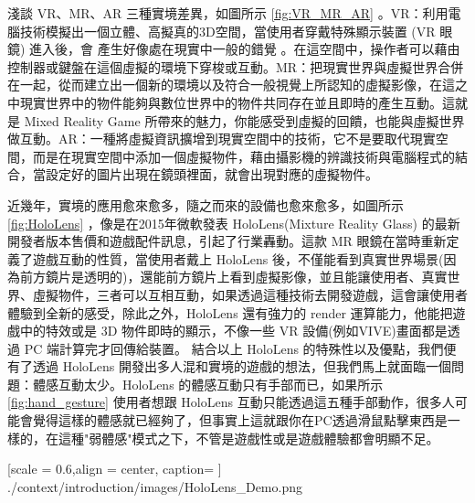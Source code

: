 
淺談 VR、MR、AR 三種實境差異，如圖所示 \ref{fig:VR_MR_AR} 。VR：利用電腦技術模擬出一個立體、高擬真的3D空間，當使用者穿戴特殊顯示裝置 (VR 眼鏡) 進入後，會 產生好像處在現實中一般的錯覺 。在這空間中，操作者可以藉由控制器或鍵盤在這個虛擬的環境下穿梭或互動。MR：把現實世界與虛擬世界合併在一起，從而建立出一個新的環境以及符合一般視覺上所認知的虛擬影像，在這之中現實世界中的物件能夠與數位世界中的物件共同存在並且即時的產生互動。這就是 Mixed Reality Game 所帶來的魅力，你能感受到虛擬的回饋，也能與虛擬世界做互動。AR：一種將虛擬資訊擴增到現實空間中的技術，它不是要取代現實空間，而是在現實空間中添加一個虛擬物件，藉由攝影機的辨識技術與電腦程式的結合，當設定好的圖片出現在鏡頭裡面，就會出現對應的虛擬物件。


近幾年，實境的應用愈來愈多，隨之而來的設備也愈來愈多，如圖所示 \ref{fig:HoloLens} ，像是在2015年微軟發表 HoloLens(Mixture Reality Glass) 的最新開發者版本售價和遊戲配件訊息，引起了行業轟動。這款 MR 眼鏡在當時重新定義了遊戲互動的性質，當使用者戴上 HoloLens 後，不僅能看到真實世界場景(因為前方鏡片是透明的)，還能前方鏡片上看到虛擬影像，並且能讓使用者、真實世界、虛擬物件，三者可以互相互動，如果透過這種技術去開發遊戲，這會讓使用者體驗到全新的感受，除此之外，HoloLens 還有強力的 render 運算能力，他能把遊戲中的特效或是 3D 物件即時的顯示，不像一些 VR 設備(例如VIVE)畫面都是透過 PC 端計算完才回傳給裝置。
結合以上 HoloLens 的特殊性以及優點，我們便有了透過 HoloLens 開發出多人混和實境的遊戲的想法，但我們馬上就面臨一個問題：體感互動太少。HoloLens 的體感互動只有手部而已，如果所示 \ref{fig:hand_gesture} 使用者想跟 HoloLens 互動只能透過這五種手部動作，很多人可能會覺得這樣的體感就已經夠了，但事實上這就跟你在PC透過滑鼠點擊東西是一樣的，在這種"弱體感"模式之下，不管是遊戲性或是遊戲體驗都會明顯不足。

%
{   
	[scale = 0.6,align = center, caption={ } ]
	{./context/introduction/images/HoloLens_Demo.png}
}%


